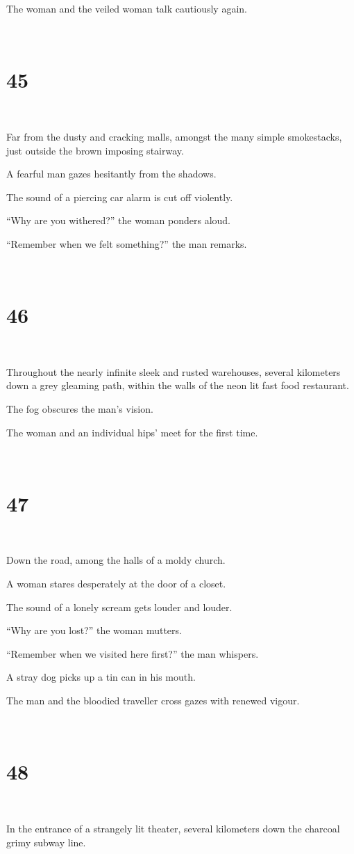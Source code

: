 \documentclass{report}
\begin{document}
The woman and the veiled woman talk cautiously again.

~
\chapter*{45}
~

Far from the dusty and cracking malls, amongst the many simple smokestacks, just outside the brown imposing stairway.

A fearful man gazes hesitantly from the shadows.

The sound of a piercing car alarm is cut off violently.

``Why are you withered?'' the woman ponders aloud.

``Remember when we felt something?'' the man remarks.

~
\chapter*{46}
~

Throughout the nearly infinite sleek and rusted warehouses, several kilometers down a grey gleaming path, within the walls of the neon lit fast food restaurant.

The fog obscures the man's vision.

The woman and an individual hips' meet for the first time.

~
\chapter*{47}
~

Down the road, among the halls of a moldy church.

A woman stares desperately at the door of a closet.

The sound of a lonely scream gets louder and louder.

``Why are you lost?'' the woman mutters.

``Remember when we visited here first?'' the man whispers.

A stray dog picks up a tin can in his mouth.

The man and the bloodied traveller cross gazes with renewed vigour.

~
\chapter*{48}
~

In the entrance of a strangely lit theater, several kilometers down the charcoal grimy subway line.
\end{document}
